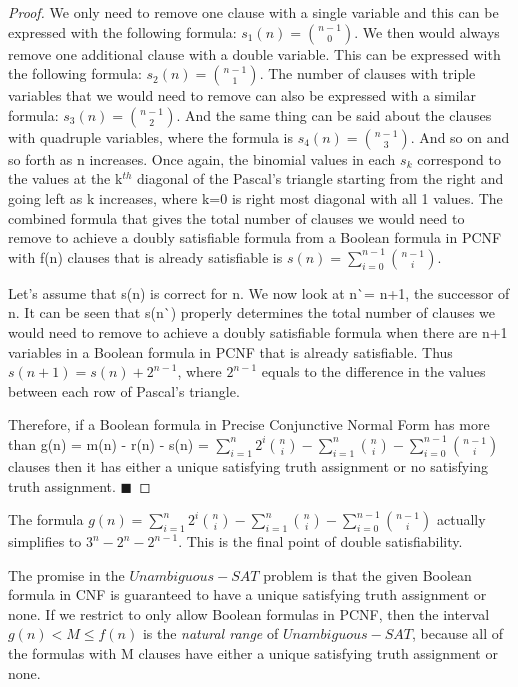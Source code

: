 \documentclass[runningheads,a4paper]{llncs}
\begin{document}
\begin{theorem}
\begin{proof}
We only need to remove one clause with a single variable and this can be expressed with the following formula: $s_{1}(n) = \binom{n-1} {0}$. We then would always remove one additional clause with a double variable. This can be expressed with the following formula: $s_{2}(n) = \binom{n-1} {1}$. The number of clauses with triple variables that we would need to remove can also be expressed with a similar formula: $s_{3}(n) = \binom{n-1} {2}$. And the same thing can be said about the clauses with quadruple variables, where the formula is $s_{4}(n) = \binom{n-1} {3}$. And so on and so forth as n increases. Once again, the binomial values in each $s_{k}$ correspond to the values at the k$^{th}$ diagonal of the Pascal's triangle starting from the right and going left as k increases, where k=0 is right most diagonal with all 1 values. The combined formula that gives the total number of clauses we would need to remove to achieve a doubly satisfiable formula from a Boolean formula in PCNF with f(n) clauses that is already satisfiable is $s(n) = \sum_{i=0}^{n-1} \binom{n-1} {i}$.

Let's assume that s(n) is correct for n. We now look at n\`{}= n+1, the successor of n. It can be seen that s(n\`{}) properly determines the total number of clauses we would need to remove to achieve a doubly satisfiable formula when there are n+1 variables in a Boolean formula in PCNF that is already satisfiable. Thus $s(n+1) = s(n) + 2^{n-1} $, where $2^{n-1}$ equals to the difference in the values between each row of Pascal's triangle. 

Therefore, if a Boolean formula in Precise Conjunctive Normal Form has more than g(n) = m(n) - r(n) - s(n) = $\sum_{i=1}^{n} 2^{i} \binom{n} {i} - \sum_{i=1}^{n} \binom{n} {i} - \sum_{i=0}^{n-1} \binom{n-1} {i} $  clauses then it has either a unique satisfying truth assignment or no satisfying truth assignment. $\blacksquare$

\end{proof}
\end{theorem}

The formula $ g(n) =  \sum_{i=1}^{n} 2^{i} \binom{n} {i} - \sum_{i=1}^{n} \binom{n} {i} -  \sum_{i=0}^{n-1} \binom{n-1} {i} $ actually simplifies to $3^{n}-2^{n}-2^{n-1}$. This is the final point of double satisfiability. 

\begin{definition}\normalfont

The promise in the ${Unambiguous-SAT}$ problem is that the given Boolean formula in CNF is guaranteed to have a unique satisfying truth assignment or none. If we restrict to only allow Boolean formulas in PCNF, then the interval $g(n)<M \leq f(n)$ is the \emph{natural range} of ${Unambiguous-SAT}$, because all of the formulas with M clauses have either a unique satisfying truth assignment or none. 

\end{definition}
\end{document}
